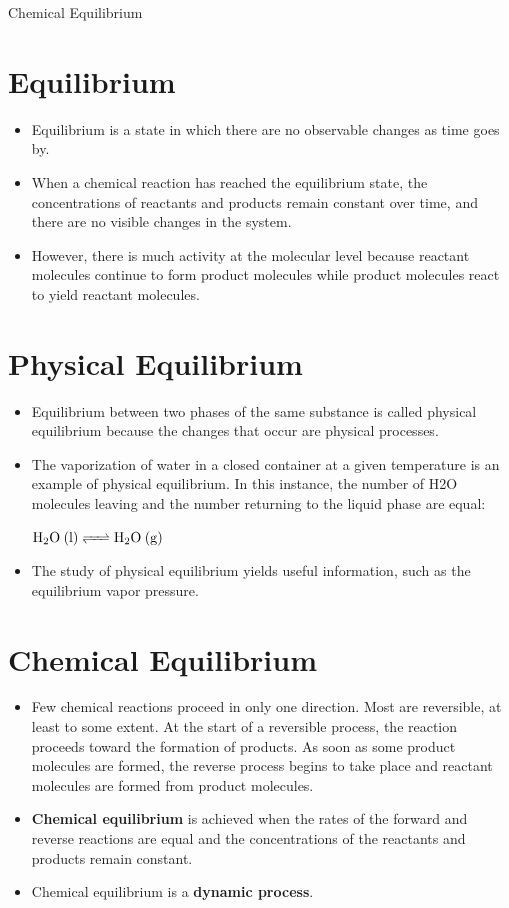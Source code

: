 \documentclass[a4paper,12pt,twocolumn]{article}
\begin{document}
\begin{center}
    \huge{Chemical Equilibrium} 
\end{center}

\section{Equilibrium}
\begin{itemize}
    \item Equilibrium is a state in which there are no observable changes as time goes by.
    \item When a chemical reaction has reached the equilibrium state, the concentrations of reactants and products remain constant over time, and there are no visible changes in the system. 
    \item However, there is much activity at the molecular level because reactant molecules continue to form product molecules while product molecules react to yield reactant molecules.
\end{itemize}

\section{Physical Equilibrium}
\begin{itemize}
    \item Equilibrium between two phases of the same substance is called physical equilibrium because the changes that occur are physical processes. 
    \item The vaporization of water in a closed container at a given temperature is an example of physical equilibrium. In this instance, the number of H2O molecules leaving and the number returning to the liquid phase are equal:
          \begin{center}
            $\ce{H2O (l) <=> H2O (g)}$
          \end{center}
    \item The study of physical equilibrium yields useful  information, such as the equilibrium vapor pressure.
\end{itemize}

\section{Chemical Equilibrium}
\begin{itemize}
    \item Few chemical reactions proceed in only one direction. Most are reversible, at least to some extent. At the start of a reversible process, the reaction proceeds toward the formation of products. As soon as some product molecules are formed, the reverse process begins to take place and reactant molecules are formed from product molecules.
    \item \textbf{Chemical equilibrium} is achieved when the rates of the forward and reverse reactions are equal and the concentrations of the reactants and products remain constant.
    \item Chemical equilibrium is a \textbf{dynamic process}.
\end{itemize}
\end{document}

